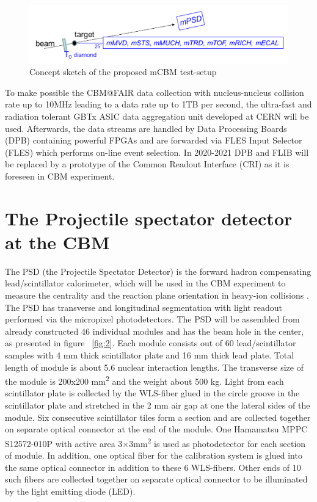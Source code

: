 \documentclass[a4paper,11pt]{article}
\begin{document}
\begin{figure}[htbp]
	\centering 
	\includegraphics[width=.8\textwidth]{mCBM_sketch.png}
	\caption{\label{fig:1} Concept sketch of the proposed mCBM test-setup}
\end{figure}

To make possible the CBM@FAIR data collection with nucleus-nucleus collision rate up to 10MHz leading to a data rate up to 1TB per second, the ultra-fast and radiation tolerant GBTx ASIC data aggregation unit developed at CERN will be used. Afterwards, the data streams are handled by Data Processing Boards (DPB) containing powerful FPGAs and are forwarded via FLES Input Selector (FLES) which performs on-line event selection. In 2020-2021 DPB and FLIB will be replaced by a prototype of the Common Readout Interface (CRI) as it is foreseen in CBM experiment.


\section{The Projectile spectator detector at the CBM}
The PSD (the Projectile Spectator Detector) is the forward hadron compensating lead/scintillator calorimeter, which will be used in the CBM experiment to measure the centrality and the reaction plane orientation in heavy-ion collisions \cite{3}. The PSD has transverse and longitudinal segmentation with light readout performed via the micropixel photodetectors. 
The PSD will be assembled from already constructed 46 individual modules and has the beam hole in the center, as presented in figure ~\ref{fig:2}. Each module consists out of 60 lead/scintillator samples with 4 mm thick scintillator plate and 16 mm thick lead plate. Total length of module is about 5.6 nuclear interaction lengths. The transverse size of the module is 200x200 mm\textsuperscript{2} and the weight about 500 kg. Light from each scintillator plate is collected by the WLS-fiber glued in the circle groove in the scintillator plate and stretched in the 2 mm air gap at one the lateral sides of the module. Six consecutive scintillator tiles form a section and are collected together on separate optical connector at the end of the module. One Hamamatsu MPPC S12572-010P with active area 3×3mm\textsuperscript{2} is used as photodetector for each section of module. In addition, one optical fiber for the calibration system is glued into the same optical connector in addition to these 6 WLS-fibers. Other ends of 10 such fibers are collected together on separate optical connector to be illuminated by the light emitting diode (LED). 
\end{document}
